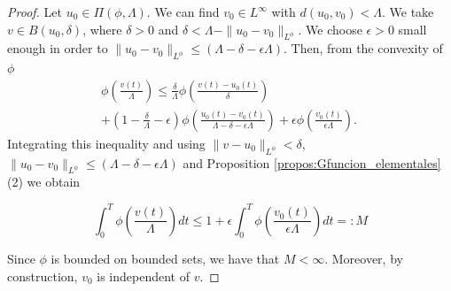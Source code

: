 \documentclass[10pt,a4paper]{amsart}
\begin{document}
\begin{proof} 
Let  $u_0 \in \Pi(\phi, \Lambda )$. We can find $v_0 \in L^\infty$ with $d(u_0, v_0) < \Lambda$. We take $ v \in B(u_0, \delta)$, where $\delta > 0$ and $\delta< \Lambda-\|u_0-v_0\|_{L^\phi}$.
We choose  $ \epsilon>0$ small enough in order to $\|u_0-v_0\|_{L^\phi} \leq \left(\Lambda-\delta-\epsilon\Lambda\right)$. Then, from the convexity of $\phi$
\begin{multline*}
  \phi \left(\frac{v(t)}{\Lambda} \right)  %
%
%
  \leq \frac{\delta}{\Lambda}\phi \left(\frac{v(t)-u_0(t)}{\delta} \right)\\
  +\left(1-\frac{\delta}{\Lambda}-\epsilon\right) \phi \left(\frac{u_0(t)-v_0(t)}{\Lambda-\delta-\epsilon\Lambda}\right) + \epsilon \phi \left( \frac{v_0(t)}{\epsilon\Lambda }\right).\
\end{multline*}
Integrating this inequality and using $\|v-u_0\|_{L^\phi}<\delta$, $\|u_0-v_0\|_{L^\phi} \leq \left(\Lambda-\delta-\epsilon\Lambda\right)$ and   Proposition \ref{propos:Gfuncion_elementales}(2)   we obtain

\[\int_0^T\phi \left(\frac{v(t)}{\Lambda} \right) dt\leq 1+\epsilon \int_0^T\phi \left( \frac{v_0(t)}{\epsilon\Lambda }\right)dt=:M\]

Since $\phi$ is bounded on bounded sets,  we have that $M<\infty$.   Moreover, by construction, $v_0$ is independent of $v$.
\end{proof}
\end{document}
